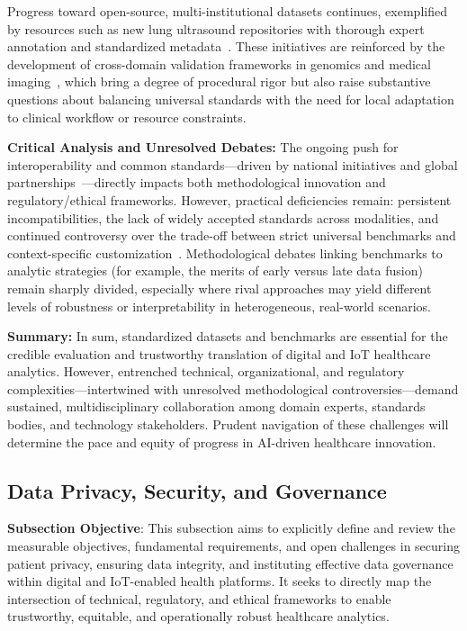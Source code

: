 \documentclass[sigconf]{acmart}
\begin{document}
Progress toward open-source, multi-institutional datasets continues, exemplified by resources such as new lung ultrasound repositories with thorough expert annotation and standardized metadata~\cite{ref58}. These initiatives are reinforced by the development of cross-domain validation frameworks in genomics and medical imaging~\cite{ref60,ref61}, which bring a degree of procedural rigor but also raise substantive questions about balancing universal standards with the need for local adaptation to clinical workflow or resource constraints.

\textbf{Critical Analysis and Unresolved Debates:} The ongoing push for interoperability and common standards—driven by national initiatives and global partnerships~\cite{ref82,ref83,ref84}—directly impacts both methodological innovation and regulatory/ethical frameworks. However, practical deficiencies remain: persistent incompatibilities, the lack of widely accepted standards across modalities, and continued controversy over the trade-off between strict universal benchmarks and context-specific customization~\cite{ref83,ref84}. Methodological debates linking benchmarks to analytic strategies (for example, the merits of early versus late data fusion) remain sharply divided, especially where rival approaches may yield different levels of robustness or interpretability in heterogeneous, real-world scenarios.

\textbf{Summary:} In sum, standardized datasets and benchmarks are essential for the credible evaluation and trustworthy translation of digital and IoT healthcare analytics. However, entrenched technical, organizational, and regulatory complexities—intertwined with unresolved methodological controversies—demand sustained, multidisciplinary collaboration among domain experts, standards bodies, and technology stakeholders. Prudent navigation of these challenges will determine the pace and equity of progress in AI-driven healthcare innovation.

\subsection{Data Privacy, Security, and Governance}

\textbf{Subsection Objective}: This subsection aims to explicitly define and review the measurable objectives, fundamental requirements, and open challenges in securing patient privacy, ensuring data integrity, and instituting effective data governance within digital and IoT-enabled health platforms. It seeks to directly map the intersection of technical, regulatory, and ethical frameworks to enable trustworthy, equitable, and operationally robust healthcare analytics.
\end{document}
